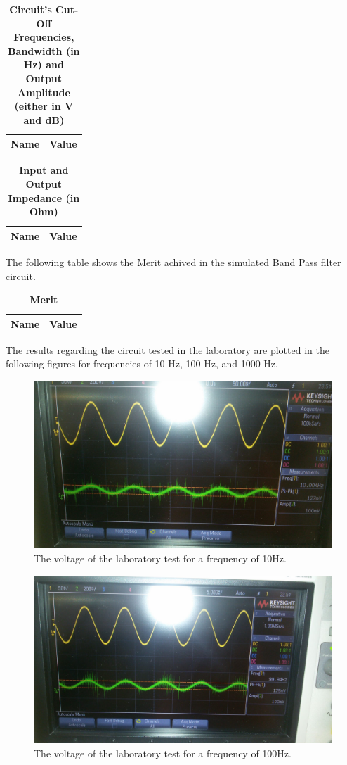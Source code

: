 \begin{table}[H]
\centering
\begin{tabular}{|l|l|}
\hline
{\bf Name} & {\bf Value} \\ \hline
    
\end{tabular}
\caption{\textbf{Circuit's Cut-Off Frequencies, Bandwidth (in Hz) and Output Amplitude (either in V and dB)}}
\end{table}

\begin{table}[H]
\centering
\begin{tabular}{|l|l|}
\hline
{\bf Name} & {\bf Value} \\ \hline
    
    
\end{tabular}
\caption{\textbf{Input and Output Impedance (in Ohm) }}
\end{table}

The following table shows the Merit achived in the simulated Band Pass filter circuit.

\begin{table}[H]
\centering
\begin{tabular}{|l|l|}
\hline
{\bf Name} & {\bf Value} \\ \hline
    
\end{tabular}
\caption{\textbf{Merit}}
\end{table}

The results regarding the circuit tested in the laboratory are plotted in the following figures for frequencies of 10 Hz, 100 Hz, and 1000 Hz.

\begin{figure}[h] 
\centering
\includegraphics[width=0.6\linewidth]{10Hz.jpeg}
\caption{The voltage of the laboratory test for a frequency of 10Hz.}
\label{Fig9: 10Hz}
\end{figure}

\begin{figure}[h] 
\centering
\includegraphics[width=0.6\linewidth]{100Hz.jpeg}
\caption{The voltage of the laboratory test for a frequency of 100Hz.}
\label{Fig10: 100Hz}
\end{figure}

